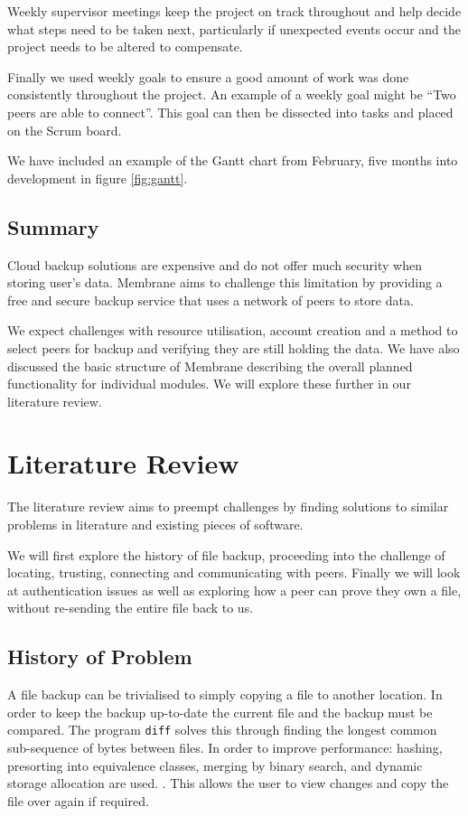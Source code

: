\documentclass[11pt, a4paper, twoside]{report}
\def\code#1{\texttt{#1}}
\begin{document}
Weekly supervisor meetings keep the project on track throughout and help decide what steps need to be taken next, particularly if unexpected events occur and the project needs to be altered to compensate.

Finally we used weekly goals to ensure a good amount of work was done consistently throughout the project. An example of a weekly goal might be ``Two peers are able to connect''. This goal can then be dissected into tasks and placed on the Scrum board.

We have included an example of the Gantt chart from February, five months into development in figure \ref{fig:gantt}.

\section{Summary}

Cloud backup solutions are expensive and do not offer much security when storing user's data. Membrane aims to challenge this limitation by providing a free and secure backup service that uses a network of peers to store data.

We expect challenges with resource utilisation, account creation and a method to select peers for backup and verifying they are still holding the data. We have also discussed the basic structure of Membrane describing the overall planned functionality for individual modules. We will explore these further in our literature review.

\chapter{Literature Review}

The literature review aims to preempt challenges by finding solutions to similar problems in literature and existing pieces of software.

We will first explore the history of file backup, proceeding into the challenge of locating, trusting, connecting and communicating with peers. Finally we will look at authentication issues as well as exploring how a peer can prove they own a file, without re-sending the entire file back to us.

\section{History of Problem}

A file backup can be trivialised to simply copying a file to another location. In order to keep the backup up-to-date the current file and the backup must be compared. The program \code{diff} solves this through finding the longest common sub-sequence of bytes between files. In order to improve performance: hashing, presorting into equivalence classes, merging by binary search, and dynamic storage allocation are used. \citep{hunt1976algorithm}. This allows the user to view changes and copy the file over again if required.
\end{document}
